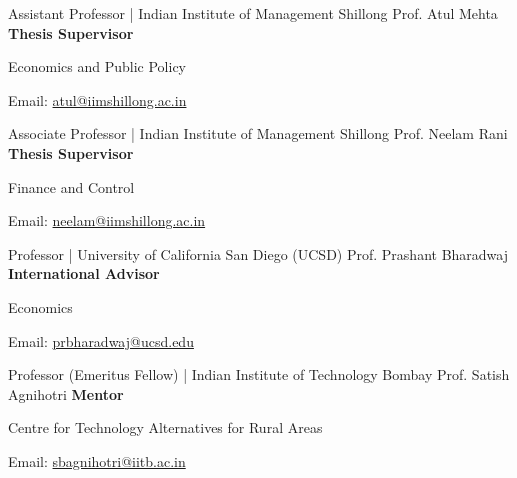 \begin{cventries}

\cventry
{Assistant Professor | Indian Institute of Management Shillong} %
{Prof. Atul Mehta} 
{\textbf{Thesis Supervisor}} %
{} %
{ %
\begin{cvitems}
\item[] Economics and Public Policy
\item[] Email: \href{mailto: atul@iimshillong.ac.in}{\color{blue}atul@iimshillong.ac.in}
\end{cvitems}
}

\cventry
{Associate Professor | Indian Institute of Management Shillong} %
{Prof. Neelam Rani} 
{\textbf{Thesis Supervisor}} %
{} %
{ %
\begin{cvitems}
\item[] Finance and Control
\item[] Email: \href{mailto: neelam@iimshillong.ac.in}{\color{blue}neelam@iimshillong.ac.in}
\end{cvitems}
}

\cventry
{Professor | University of California San Diego (UCSD)} %
{Prof. Prashant Bharadwaj} 
{\textbf{International Advisor}} %
{} %
{ %
\begin{cvitems}
\item[] Economics
\item[] Email: \href{mailto: prbharadwaj@ucsd.edu}{\color{blue} prbharadwaj@ucsd.edu}
\end{cvitems}
}

\cventry
{Professor (Emeritus Fellow) | Indian Institute of Technology Bombay} %
{Prof. Satish Agnihotri} 
{\textbf{Mentor}} %
{} %
{ %
\begin{cvitems}
\item[] Centre for Technology Alternatives for Rural Areas
\item[] Email: \href{mailto: sbagnihotri@iitb.ac.in}{\color{blue} sbagnihotri@iitb.ac.in}
\end{cvitems}
}

\end{cventries}